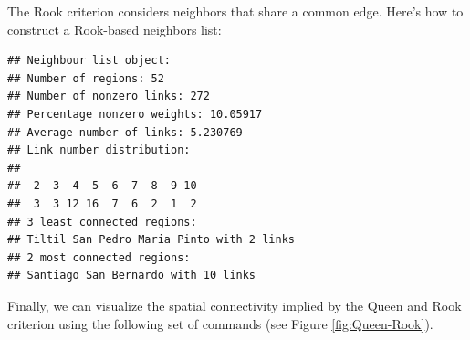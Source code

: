 The Rook criterion considers neighbors that share a common edge. Here's how to construct a Rook-based neighbors list:
\begin{knitrout}
\color{fgcolor}\begin{kframe}
\begin{alltt}
 \hlkwb{<-} \hldef{(} \hldef{),}  \hlopt{$}  \hldef{=}  \hldef{)}
\end{alltt}
\begin{verbatim}
## Neighbour list object:
## Number of regions: 52 
## Number of nonzero links: 272 
## Percentage nonzero weights: 10.05917 
## Average number of links: 5.230769 
## Link number distribution:
## 
##  2  3  4  5  6  7  8  9 10 
##  3  3 12 16  7  6  2  1  2 
## 3 least connected regions:
## Tiltil San Pedro Maria Pinto with 2 links
## 2 most connected regions:
## Santiago San Bernardo with 10 links
\end{verbatim}
\end{kframe}
\end{knitrout}

Finally, we can visualize the spatial connectivity implied by the Queen and Rook criterion using the following set of commands (see Figure \ref{fig:Queen-Rook}). 

\begin{knitrout}
\color{fgcolor}\begin{kframe}
\begin{alltt}
\hldef{(}  \hldef{=} \hldef{)}
 \hlkwb{<-} \hldef{(}\hldef{(}
  \hldef{=}  \hldef{,}  \hldef{=} \hldef{)}
  \hldef{=}  \hldef{,}  \hldef{=} \hldef{)}
\end{alltt}
\end{kframe}
\end{knitrout}

